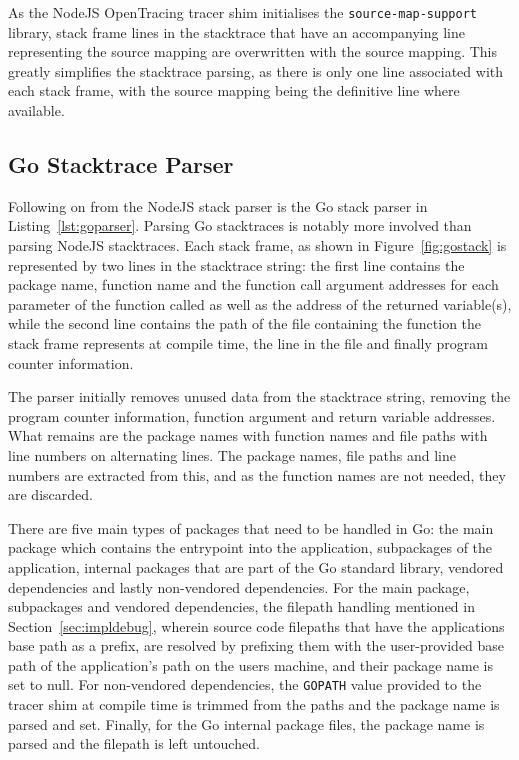 \documentclass[12pt,pdftex,titlepage]{report}
\begin{document}
                As the NodeJS OpenTracing tracer shim initialises the \texttt{source-map-support} library, stack frame lines in the stacktrace that have an 
                accompanying line representing the source mapping are overwritten with the source mapping. This greatly simplifies the stacktrace parsing, as there is only one line
                associated with each stack frame, with the source mapping being the definitive line where available.

            \subsection{Go Stacktrace Parser}
            \label{sec:goparser}
                Following on from the NodeJS stack parser is the Go stack parser in Listing~\ref{lst:goparser}. Parsing Go stacktraces is notably more involved than parsing NodeJS 
                stacktraces. Each stack frame, as shown in Figure~\ref{fig:gostack} is represented by two lines in the stacktrace string: the first line contains the package name, function name 
                and the function call argument addresses for each parameter of the function called as well as the address of the returned variable(s), while the second line contains the path of 
                the file containing the function the stack frame represents at compile time, the line in the file and finally program counter information. 

                The parser initially removes unused data from the stacktrace string, removing the program counter information, function argument and return variable addresses. What remains
                are the package names with function names and file paths with line numbers on alternating lines. The package names, file paths and line numbers are extracted from this, and
                as the function names are not needed, they are discarded. 

                There are five main types of packages that need to be handled in Go: the main package which contains the entrypoint into the application, subpackages of the application,
                internal packages that are part of the Go standard library, vendored dependencies and lastly non-vendored dependencies. For the main package, subpackages and vendored
                dependencies, the filepath handling mentioned in Section~\ref{sec:impldebug}, wherein source code filepaths that have the applications base path as a prefix, are resolved by prefixing
                them with the user-provided base path of the application's path on the users machine, and their package name is set to null. For non-vendored dependencies, the \texttt{GOPATH} 
                value provided to the tracer shim at compile time is trimmed from the paths and the package name is parsed and set. Finally, for the Go internal package files, the package name
                is parsed and the filepath is left untouched.
\end{document}
